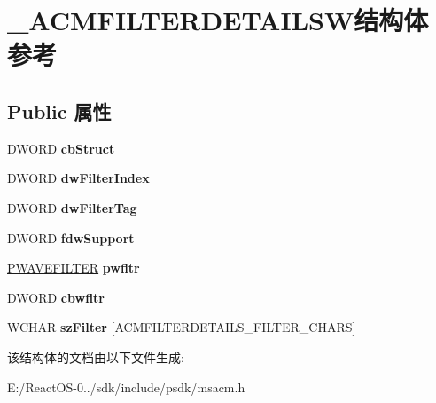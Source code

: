 \hypertarget{struct___a_c_m_f_i_l_t_e_r_d_e_t_a_i_l_s_w}{}\section{\+\_\+\+A\+C\+M\+F\+I\+L\+T\+E\+R\+D\+E\+T\+A\+I\+L\+S\+W结构体 参考}
\label{struct___a_c_m_f_i_l_t_e_r_d_e_t_a_i_l_s_w}
\subsection*{Public 属性}
\begin{DoxyCompactItemize}
\item 
\mbox{\label{struct___a_c_m_f_i_l_t_e_r_d_e_t_a_i_l_s_w_ae4f2cfc18a82bf7e51722cb41c7ee32a}} 
D\+W\+O\+RD {\bfseries cb\+Struct}
\item 
\mbox{\label{struct___a_c_m_f_i_l_t_e_r_d_e_t_a_i_l_s_w_a0dec7685c26a225d80d4c94c1740ed33}} 
D\+W\+O\+RD {\bfseries dw\+Filter\+Index}
\item 
\mbox{\label{struct___a_c_m_f_i_l_t_e_r_d_e_t_a_i_l_s_w_ab93af1c0f4b7c9cfa4e7a9aa3f35b715}} 
D\+W\+O\+RD {\bfseries dw\+Filter\+Tag}
\item 
\mbox{\label{struct___a_c_m_f_i_l_t_e_r_d_e_t_a_i_l_s_w_ab72fa50508a953a0c96de7794b15a961}} 
D\+W\+O\+RD {\bfseries fdw\+Support}
\item 
\mbox{\label{struct___a_c_m_f_i_l_t_e_r_d_e_t_a_i_l_s_w_ad14f3ba1dafac21b3270963939546007}} 
\hyperlink{struct___w_a_v_e_f_i_l_t_e_r}{P\+W\+A\+V\+E\+F\+I\+L\+T\+ER} {\bfseries pwfltr}
\item 
\mbox{\label{struct___a_c_m_f_i_l_t_e_r_d_e_t_a_i_l_s_w_a6dd613964e571b20a8bd7f5d4038484f}} 
D\+W\+O\+RD {\bfseries cbwfltr}
\item 
\mbox{\label{struct___a_c_m_f_i_l_t_e_r_d_e_t_a_i_l_s_w_a560af483d7d869f24d7039cf486c8ca8}} 
W\+C\+H\+AR {\bfseries sz\+Filter} \mbox{[}A\+C\+M\+F\+I\+L\+T\+E\+R\+D\+E\+T\+A\+I\+L\+S\+\_\+\+F\+I\+L\+T\+E\+R\+\_\+\+C\+H\+A\+RS\mbox{]}
\end{DoxyCompactItemize}


该结构体的文档由以下文件生成\+:\begin{DoxyCompactItemize}
\item 
E\+:/\+React\+O\+S-\/0../sdk/include/psdk/msacm.\+h\end{DoxyCompactItemize}
